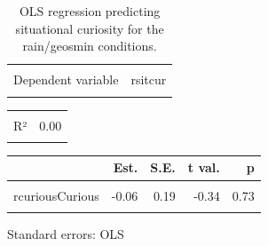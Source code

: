 \documentclass[
  letterpaper,
  DIV=11,
  numbers=noendperiod]{scrartcl}
\begin{document}
\hypertarget{tbl-rsitcur}{}
\begin{table}[!h]
\caption{\label{tbl-rsitcur}OLS regression predicting situational curiosity for the rain/geosmin
conditions. }\tabularnewline

\centering
\begin{tabular}{lr}
\toprule
\cellcolor{gray!10}{Observations} & \cellcolor{gray!10}{237}\\
Dependent variable & rsitcur\\
\cellcolor{gray!10}{Type} & \cellcolor{gray!10}{OLS linear regression}\\
\bottomrule
\end{tabular}
\end{table} \begin{table}[!h]
\centering
\begin{tabular}{lr}
\toprule
\cellcolor{gray!10}{F(2,234)} & \cellcolor{gray!10}{0.06}\\
R² & 0.00\\
\cellcolor{gray!10}{Adj. R²} & \cellcolor{gray!10}{-0.01}\\
\bottomrule
\end{tabular}
\end{table} \begin{table}[!h]
\centering
\begin{threeparttable}
\begin{tabular}{lrrrr}
\toprule
  & Est. & S.E. & t val. & p\\
\midrule
\cellcolor{gray!10}{(Intercept)} & \cellcolor{gray!10}{4.60} & \cellcolor{gray!10}{0.16} & \cellcolor{gray!10}{28.21} & \cellcolor{gray!10}{0.00}\\
rcuriousCurious & -0.06 & 0.19 & -0.34 & 0.73\\
\cellcolor{gray!10}{rresoResolution} & \cellcolor{gray!10}{-0.01} & \cellcolor{gray!10}{0.19} & \cellcolor{gray!10}{-0.07} & \cellcolor{gray!10}{0.95}\\
\bottomrule
\end{tabular}
\begin{tablenotes}
\item Standard errors: OLS
\end{tablenotes}
\end{threeparttable}
\end{table}
\end{document}
